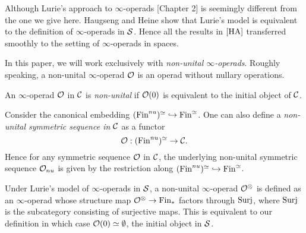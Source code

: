 \begin{remark}
Although Lurie's approach to $\infty$-operads \cite{HA}[Chapter 2] is seemingly different from the one we give here. 
Haugseng \cite{Haugsengsymseq} and Heine \cite{Hadrianphdthesis} show that Lurie's model is equivalent to the definition of $\infty$-operads in $\operatorname{\mathcal{S}}$. Hence all the results in $\cite{HA}$ transferred smoothly to the setting of $\infty$-operads in spaces.
\end{remark}

In this paper, we will work exclusively with \emph{non-unital $\infty$-operads}. Roughly speaking, a non-unital $\infty$-operad ${\mathcal{O}}$ is an operad without nullary operations.
\begin{definition}
	\label{non-unital operad}
	An $\infty$-operad ${\mathcal{O}}$ in ${\mathcal{C}}$ is \emph{non-unital} if ${\mathcal{O}}(0)$ is equivalent to the initial object of ${\mathcal{C}}$. 
\end{definition}



\begin{remark}
Consider the canonical embedding $(\operatorname{Fin}^{nu})^{\simeq}\hookrightarrow \operatorname{Fin}^{\simeq}$. One can also define a \emph{non-unital symmetric sequence in ${\mathcal{C}}$}  as a functor 
\[
{\mathcal{O}}:(\operatorname{Fin}^{nu})^{\simeq}\to {\mathcal{C}}.
\]
Hence for any symmetric sequence ${\mathcal{O}}$ in ${\mathcal{C}}$, 
the underlying non-unital symmetric sequence ${\mathcal{O}}_{nu}$ is given by the restriction along $(\operatorname{Fin}^{nu})^{\simeq}\hookrightarrow \operatorname{Fin}^{\simeq}$.
\end{remark}

\begin{remark}
	Under Lurie's model of $\infty$-operads in $\operatorname{\mathcal{S}}$, a non-unital $\infty$-operad ${\mathcal{O}}^{\otimes}$ is defined as an $\infty$-operad whose structure map ${\mathcal{O}}^{\otimes} \to \operatorname{Fin}_*$ factors through $\operatorname{Surj}$, where $\operatorname{Surj}$ is the subcategory consisting of surjective maps. This is equivalent to our definition in which case ${\mathcal{O}}(0)\simeq \emptyset$, the initial object in $\operatorname{\mathcal{S}}$.
\end{remark}










